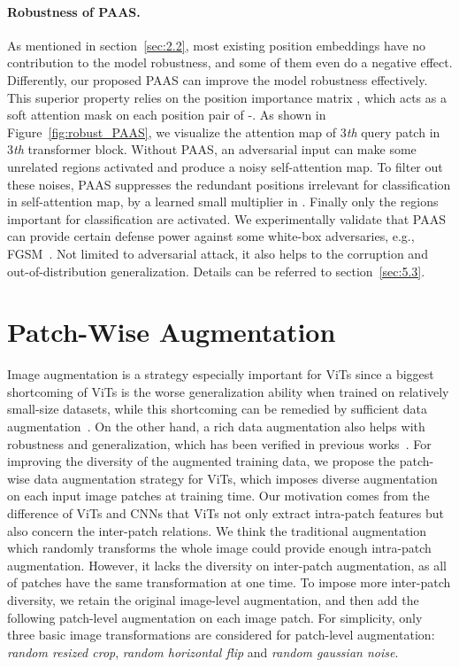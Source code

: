 \documentclass[10pt,twocolumn,letterpaper]{article}
\begin{document}
\paragraph{Robustness of PAAS.} As mentioned in section~\ref{sec:2.2}, most existing position embeddings have no contribution to the model robustness, and some of them even do a negative effect. Differently, our proposed PAAS can improve the model robustness effectively. This superior property relies on the position importance matrix , which acts as a soft attention mask on each position pair of -. As shown in Figure~\ref{fig:robust_PAAS}, we visualize the attention map of 3\emph{th} query patch in 3\emph{th} transformer block. Without PAAS, an adversarial input can make some unrelated regions activated and produce a noisy self-attention map. To filter out these noises, PAAS suppresses the redundant positions irrelevant for classification in self-attention map, by a learned small multiplier in . Finally only the regions important for classification are activated. We experimentally validate that PAAS can provide certain defense power against some white-box adversaries, e.g., FGSM~\cite{goodfellow2014explaining}. Not limited to adversarial attack, it also helps to the corruption and out-of-distribution generalization. Details can be referred to section~\ref{sec:5.3}.

\section{Patch-Wise Augmentation}
Image augmentation is a strategy especially important for ViTs since a biggest shortcoming of ViTs is the worse generalization ability when trained on relatively small-size datasets, while this shortcoming can be remedied by sufficient data augmentation~\cite{touvron2020training}. On the other hand, a rich data augmentation also helps with robustness and generalization, which has been verified in previous works~\cite{hendrycks2019augmix}. For improving the diversity of the augmented training data, we propose the patch-wise data augmentation strategy for ViTs, which imposes diverse augmentation on each input image patches at training time. Our motivation comes from the difference of ViTs and CNNs that ViTs not only extract intra-patch features but also concern the inter-patch relations. We think the traditional augmentation which randomly transforms the whole image could provide enough intra-patch augmentation. However, it lacks the diversity on inter-patch augmentation, as all of patches have the same transformation at one time. To impose more inter-patch diversity, we retain the original image-level augmentation, and then add 
the following patch-level augmentation on each image patch. For simplicity, only three basic image transformations are considered for patch-level augmentation: \emph{random resized crop}, \emph{random horizontal flip} and \emph{random gaussian noise}.
\end{document}
